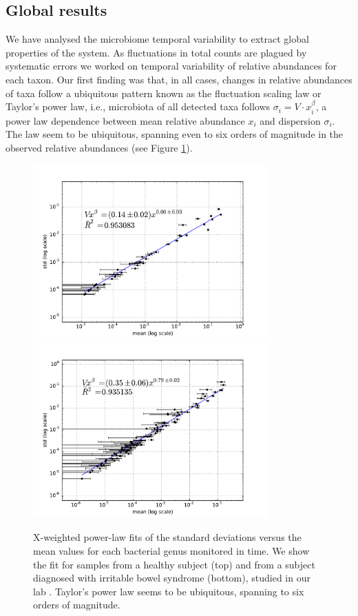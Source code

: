 \subsection*{Global results}

We have analysed the microbiome temporal variability to extract global properties of the system. As fluctuations in total counts are plagued by systematic errors we worked on temporal variability of relative abundances for each taxon. Our first finding was that, in all cases, changes in relative abundances of taxa follow a ubiquitous pattern known as the fluctuation scaling law\cite{fs} or Taylor's  power law\cite{taylor}, i.e., microbiota of all detected taxa follows $\sigma_i  = V\cdot x_i^{\beta}$, a power law dependence between mean relative abundance $x_i$ and dispersion $\sigma_i$. The law seem to be ubiquitous, spanning even to six orders of magnitude in the observed relative abundances (see Figure \ref{fig:main1}). 

\begin{figure}
	\centering
	\vspace*{-15mm} %
	\includegraphics[width=0.8\textwidth]{results/fits/IBS_h_A_amplicons_family_stdVSmean_xWboot_LOG.pdf}
	\includegraphics[width=0.8\textwidth]{results/fits/IBS_P2_Metatranscriptores_stdVSmean_xWboot_LOG.pdf}
	\caption{X-weighted power-law fits of the standard deviations versus the mean values for each bacterial genus monitored in time. We show the fit for samples from a healthy subject (top) and from a subject diagnosed with irritable bowel syndrome (bottom), studied in our lab \cite{IBS}. Taylor's power law seems to be ubiquitous, spanning to six orders of magnitude.}
	\label{fig:main1}
\end{figure}

